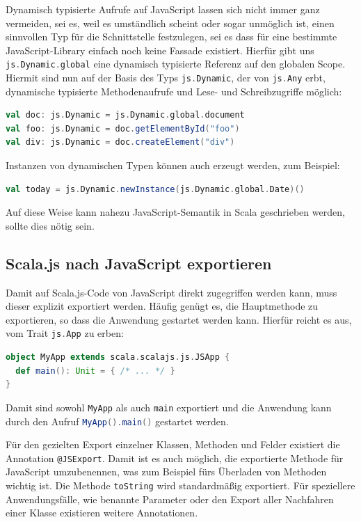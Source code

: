 \documentclass[a4paper, 12pt, hidelinks, listof=totoc, listoftables=totoc, bibliography=totoc]{scrreprt}
\newcommand{\scala}[1]{\lstinline[language=Scala, style=inline]|#1|}
\begin{document}
Dynamisch typisierte Aufrufe auf JavaScript lassen sich nicht immer ganz vermeiden, sei es, weil es umständlich scheint oder sogar unmöglich ist, einen sinnvollen Typ für die Schnittstelle festzulegen, sei es dass für eine bestimmte JavaScript-Library einfach noch keine Fassade existiert. Hierfür gibt uns \scala{js.Dynamic.global} eine dynamisch typisierte Referenz auf den globalen Scope. Hiermit sind nun auf der Basis des Typs \scala{js.Dynamic}, der von \scala{js.Any} erbt, dynamische typisierte Methodenaufrufe und Lese- und Schreibzugriffe möglich:

\begin{lstlisting}[language=Scala, style=snippet]
val doc: js.Dynamic = js.Dynamic.global.document
val foo: js.Dynamic = doc.getElementById("foo")
val div: js.Dynamic = doc.createElement("div")
\end{lstlisting}

Instanzen von dynamischen Typen können auch erzeugt werden, zum Beispiel:
\begin{lstlisting}[language=Scala, style=snippet]
val today = js.Dynamic.newInstance(js.Dynamic.global.Date)()
\end{lstlisting}

Auf diese Weise kann nahezu JavaScript-Semantik in Scala geschrieben werden, sollte dies nötig sein.\cite[Vgl.][]{scalajs.DCJ}

\subsection{Scala.js nach JavaScript exportieren}

Damit auf Scala.js-Code von JavaScript direkt zugegriffen werden kann, muss dieser explizit exportiert werden. Häufig genügt es, die Hauptmethode zu exportieren, so dass die Anwendung gestartet werden kann. Hierfür reicht es aus, vom Trait \scala{js.App} zu erben:

\begin{lstlisting}[language=Scala, style=snippet]
object MyApp extends scala.scalajs.js.JSApp {
  def main(): Unit = { /* ... */ }
}
\end{lstlisting}

Damit sind sowohl \scala{MyApp} als auch \scala{main} exportiert und die Anwendung kann durch den Aufruf \scala{MyApp().main()} gestartet werden.

Für den gezielten Export einzelner Klassen, Methoden und Felder existiert die Annotation \scala{@JSExport}. Damit ist es auch möglich, die exportierte Methode für JavaScript umzubenennen, was zum Beispiel fürs Überladen von Methoden wichtig ist. Die Methode \scala{toString} wird standardmäßig exportiert. Für speziellere Anwendungsfälle, wie benannte Parameter oder den Export aller Nachfahren einer Klasse existieren weitere Annotationen.\cite[Vgl.][]{scalajs.DEJ}
\end{document}
